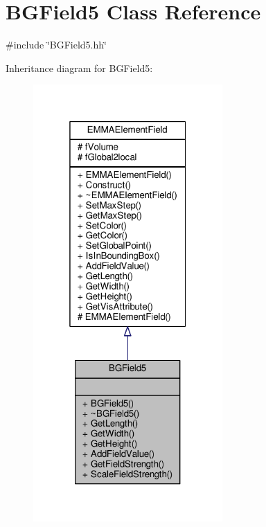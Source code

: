 \hypertarget{classBGField5}{}\section{B\+G\+Field5 Class Reference}
\label{classBGField5}


{\ttfamily \#include \char`\"{}B\+G\+Field5.\+hh\char`\"{}}



Inheritance diagram for B\+G\+Field5\+:
\nopagebreak
\begin{figure}[H]
\begin{center}
\leavevmode
\includegraphics[width=205pt]{classBGField5__inherit__graph}
\end{center}
\end{figure}


